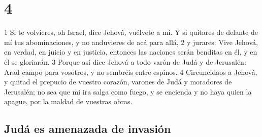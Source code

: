 \chapter{4}

1 Si te volvieres, oh Israel, dice Jehová, vuélvete a mí. Y si quitares de delante de mí tus abominaciones, y no anduvieres de acá para allá,
2 y jurares: Vive Jehová, en verdad, en juicio y en justicia, entonces las naciones serán benditas en él, y en él se gloriarán.
3 Porque así dice Jehová a todo varón de Judá y de Jerusalén: Arad campo para vosotros, y no sembréis entre espinos. 
4 Circuncidaos a Jehová, y quitad el prepucio de vuestro corazón, varones de Judá y moradores de Jerusalén; no sea que mi ira salga como fuego, y se encienda y no haya quien la apague, por la maldad de vuestras obras.

\section*{Judá es amenazada de invasión}

